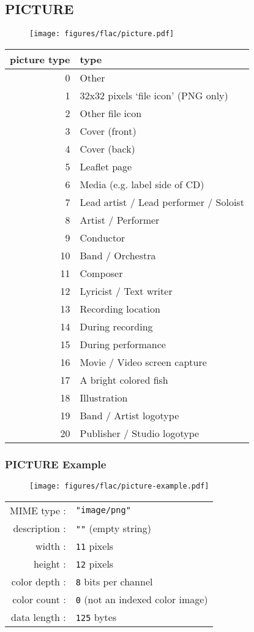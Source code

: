 \subsection{PICTURE}
\begin{figure}[h]
\texttt{[image: figures/flac/picture.pdf]}
\end{figure}
{
\begin{tabular}{r|l}
picture type & type \\
\hline
0 & Other \\
1 & 32x32 pixels `file icon' (PNG only) \\
2 & Other file icon \\
3 & Cover (front) \\
4 & Cover (back) \\
5 & Leaflet page \\
6 & Media (e.g. label side of CD) \\
7 & Lead artist / Lead performer / Soloist \\
8 & Artist / Performer \\
9 & Conductor \\
10 & Band / Orchestra \\
11 & Composer \\
12 & Lyricist / Text writer \\
13 & Recording location \\
14 & During recording \\
15 & During performance \\
16 & Movie / Video screen capture \\
17 & A bright colored fish \\
18 & Illustration \\
19 & Band / Artist logotype \\
20 & Publisher / Studio logotype \\
\end{tabular}
}
\clearpage

\subsubsection{PICTURE Example}
\begin{figure}[h]
  \texttt{[image: figures/flac/picture-example.pdf]}
\end{figure}
\begin{table}[h]
{
  \begin{tabular}{rl}
    MIME type : & \texttt{"image/png"} \\
    description : & \texttt{""} (empty string) \\
    width : & \texttt{11} pixels \\
    height : & \texttt{12} pixels \\
    color depth : & \texttt{8} bits per channel \\
    color count : & \texttt{0} (not an indexed color image) \\
    data length : & \texttt{125} bytes \\
  \end{tabular}
}
\end{table}

